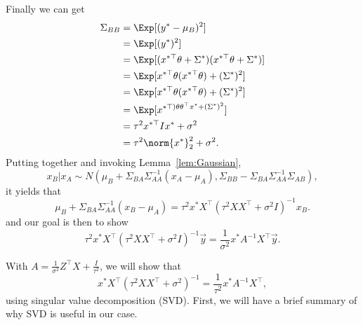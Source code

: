 Finally we can get
\begin{equation*} \label{eq1}
	\begin{split}
		\Sigma_{BB} & = \Exp[(y^* - \mu_B)^2] \\
		& = \Exp[(y^*)^2] \\
		& = \Exp[(x^{*\top} \theta + \Sigma^*)(x^{*\top}\theta + \Sigma^*)] \\
		& = \Exp[x^{*\top} \theta(x^{*\top}\theta) + (\Sigma^*)^2] \\
		& = \Exp[x^{*\top} \theta (x^{*\top}\theta) + (\Sigma^*)^2] \\
		& = \Exp[x^{*\top) \theta \theta^\top x^* + (\Sigma^*)^2}] \\
		& = \tau^2 x^{*\top} I x^* + \sigma^2 \\
		& = \tau^2 \norm{x^*}_2^2 + \sigma^2.
	\end{split}
\end{equation*}
Putting together and invoking Lemma~\ref{lem:Gaussian}, 
\begin{equation*} \label{eu_eqn}
	x_B | x_A \sim N (\mu_B + \Sigma_{BA} \Sigma_{AA}^{-1} (x_A - \mu_A), \Sigma_{BB} - \Sigma_{BA} \Sigma_{AA}^{-1} \Sigma_{AB}),
\end{equation*}
it yields that
\begin{equation*} \label{eu_eqn}
	\mu_B + \Sigma_{BA} \Sigma_{AA}^{-1} (x_B - \mu_A)
	=\tau^2 x^* X^\top (\tau^2 XX^\top + \sigma^2 I)^{-1} x_B.
\end{equation*}
and our goal is then to show 
\begin{equation} \label{eq:Gaussian-2}
	\tau^2 x^* X^\top (\tau^2 XX^\top + \sigma^2 I)^{-1}  \overrightarrow{y} = \frac{1}{\sigma^2} x^* A^{-1} X^\top \overrightarrow{y}.
\end{equation}

With $A = \frac{1}{\sigma^2} Z^\top X + \frac{I}{\tau^2}$, we will show that 
\begin{equation*} \label{eu_eqn}
	x^* X^\top (\tau^2 XX^\top + \sigma^2)^{-1} = \frac{1}{\tau^2} x^* A^{-1} X^\top,
\end{equation*}
using singular value decomposition (SVD).  First, we will have a brief summary of why SVD is useful in our case. 


